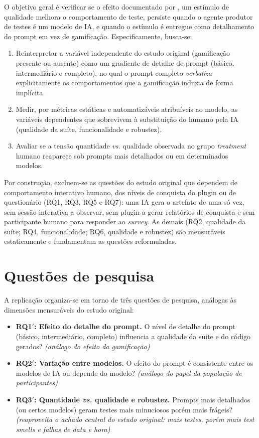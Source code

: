 \documentclass[12pt]{article}
\begin{document}
O objetivo geral é verificar se o efeito documentado por \cite{straubinger2025}, um estímulo de qualidade melhora o comportamento de teste, persiste
quando o agente produtor de testes é um modelo de IA, e quando o estímulo é
entregue como detalhamento do prompt em vez de gamificação. Especificamente,
busca-se:

\begin{enumerate}
  \item Reinterpretar a variável independente do estudo original (gamificação
  presente ou ausente) como um gradiente de detalhe de prompt (básico,
  intermediário e completo), no qual o prompt completo \emph{verbaliza}
  explicitamente os comportamentos que a gamificação induzia de forma
  implícita.
  \item Medir, por métricas estáticas e automatizáveis atribuíveis ao modelo,
  as variáveis dependentes que sobrevivem à substituição do humano pela IA
  (qualidade da suíte, funcionalidade e robustez).
  \item Avaliar se a tensão quantidade \emph{vs.} qualidade observada no grupo
  \emph{treatment} humano reaparece sob prompts mais detalhados ou em
  determinados modelos.
\end{enumerate}

Por construção, excluem-se as questões do estudo original que dependem de
comportamento interativo humano, dos níveis de conquista do plugin ou de
questionário (RQ1, RQ3, RQ5 e RQ7): uma IA gera o artefato de uma só vez, sem
sessão interativa a observar, sem plugin a gerar relatórios de conquista e sem
participante humano para responder ao \emph{survey}. As demais (RQ2, qualidade
da suíte; RQ4, funcionalidade; RQ6, qualidade e robustez) são mensuráveis
estaticamente e fundamentam as questões reformuladas.

\section{Questões de pesquisa}

A replicação organiza-se em torno de três questões de pesquisa, análogas às
dimensões mensuráveis do estudo original:

\begin{itemize}
  \item \textbf{RQ1$'$: Efeito do detalhe do prompt.} O nível de detalhe do
  prompt (básico, intermediário, completo) influencia a qualidade da suíte e do
  código gerados? \emph{(análogo do efeito da gamificação)}
  \item \textbf{RQ2$'$: Variação entre modelos.} O efeito do prompt é
  consistente entre os modelos de IA ou depende do modelo? \emph{(análogo do
  papel da população de participantes)}
  \item \textbf{RQ3$'$: Quantidade \emph{vs.} qualidade e robustez.} Prompts
  mais detalhados (ou certos modelos) geram testes mais minuciosos porém mais
  frágeis? \emph{(reaproveita o achado central do estudo original: mais testes,
  porém mais \emph{test smells} e falhas de data e hora)}
\end{itemize}
\end{document}
